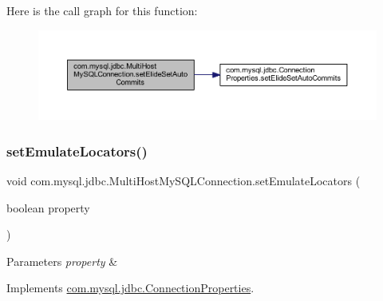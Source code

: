 Here is the call graph for this function\+:
\nopagebreak
\begin{figure}[H]
\begin{center}
\leavevmode
\includegraphics[width=350pt]{classcom_1_1mysql_1_1jdbc_1_1_multi_host_my_s_q_l_connection_a35d47c30cf0ef068eea0302f63e99226_cgraph}
\end{center}
\end{figure}
\mbox{\label{classcom_1_1mysql_1_1jdbc_1_1_multi_host_my_s_q_l_connection_acf59bfc5610337b83b617986cfb1b2a5}} 
\subsubsection{\texorpdfstring{set\+Emulate\+Locators()}{setEmulateLocators()}}
{\footnotesize\ttfamily void com.\+mysql.\+jdbc.\+Multi\+Host\+My\+S\+Q\+L\+Connection.\+set\+Emulate\+Locators (\begin{DoxyParamCaption}\item[{boolean}]{property }\end{DoxyParamCaption})}


\begin{DoxyParams}{Parameters}
{\em property} & \\
\hline
\end{DoxyParams}


Implements \mbox{\hyperlink{interfacecom_1_1mysql_1_1jdbc_1_1_connection_properties_a3cbd4f864707e036d8013706d632a807}{com.\+mysql.\+jdbc.\+Connection\+Properties}}.


